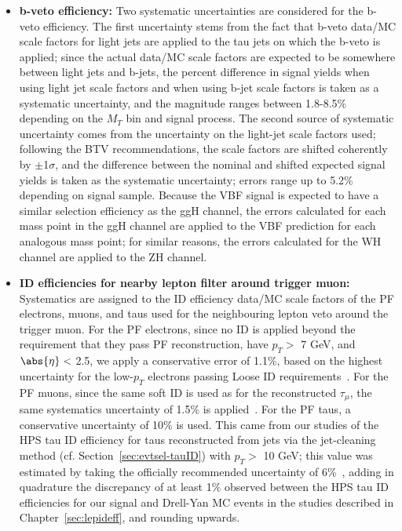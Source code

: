 \begin{itemize}
\item \textbf{b-veto efficiency: } Two systematic uncertainties are considered for the b-veto efficiency. The first uncertainty stems from the fact that b-veto data/MC scale factors for light jets are applied to the tau jets on which the b-veto is applied; since the actual data/MC scale factors are expected to be somewhere between light jets and b-jets, the percent difference in signal yields when using light jet scale factors and when using b-jet scale factors is taken as a systematic uncertainty, and the magnitude ranges between 1.8-8.5\% depending on the $M_{T}$ bin and signal process. The second source of systematic uncertainty comes from the uncertainty on the light-jet scale factors used; following the BTV recommendations, the scale factors are shifted coherently by $\pm$1$\sigma$, and the difference between the nominal and shifted expected signal yields is taken as the systematic uncertainty; errors range up to 5.2\% depending on signal sample. Because the VBF signal is expected to have a similar selection efficiency as the ggH channel, the errors calculated for each mass point in the ggH channel are applied to the VBF prediction for each analogous mass point; for similar reasons, the errors calculated for the WH channel are applied to the ZH channel.
\item \textbf{ID efficiencies for nearby lepton filter around trigger muon: } Systematics are assigned to the ID efficiency data/MC scale factors of the PF electrons, muons, and taus used for the neighbouring lepton veto around the trigger muon. For the PF electrons, since no ID is applied beyond the requirement that they pass PF reconstruction, have $p_T >$ 7 GeV, and $\abs{\eta} <$ 2.5, we apply a conservative error of 1.1\%, based on the highest uncertainty for the low-$p_T$ electrons passing Loose ID requirements~\cite{CMS:egammauncertaintytwiki}. For the PF muons, since the same soft ID is used as for the reconstructed $\tau_{\mu}$, the same systematics uncertainty of 1.5\% is applied~\cite{CMS:muonuncertaintytwiki}. For the PF taus, a conservative uncertainty of 10\% is used. This came from our studies of the HPS tau ID efficiency for taus reconstructed from jets via the jet-cleaning method (cf. Section~\ref{sec:evtsel-tauID}) with $p_T >$ 10 GeV; this value was estimated by taking the officially recommended uncertainty of 6\%~\cite{CMS:tauuncertaintytwiki}, adding in quadrature the discrepancy of at least 1\% observed between the HPS tau ID efficiencies for our signal and Drell-Yan MC events in the studies described in Chapter~\ref{sec:lepideff}, and rounding upwards.

\end{itemize}
